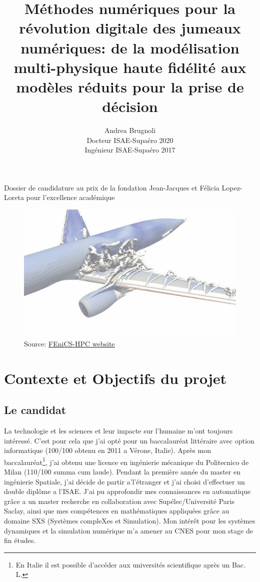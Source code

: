 \documentclass[french]{article}
\author{Andrea Brugnoli \\ 
\hspace{2.8pt} Docteur ISAE-Supaéro 2020\\
Ingénieur ISAE-Supaéro 2017}
\title{Méthodes numériques pour la révolution digitale des jumeaux numériques: de la modélisation multi-physique haute fidélité aux modèles réduits pour la prise de décision}
\date{}
\begin{document}
\maketitle

\large{Dossier de candidature au prix de la fondation Jean-Jacques et Félicia
	Lopez-Loreta pour l’excellence académique}


\begin{figure}[h]
	\centering
	\includegraphics[width=.95\textwidth]{3Dplane.jpg}
	\captionsetup{labelformat=empty}
	\caption{Source: \href{http://www.fenics-hpc.org/}{FEniCS-HPC website}}
\end{figure}





\thispagestyle{empty}

\newpage

\section{Contexte et Objectifs du projet}

\subsection{Le candidat}
La technologie et les sciences et leur impacte sur l'humaine m'ont toujours intéressé. C'est pour cela que j'ai opté pour un baccalauréat littéraire avec option informatique (100/100 obtenu en 2011 a Vérone, Italie). Après mon baccalauréat\footnote{En Italie il est possible d'accéder aux universités scientifique après un Bac. L.}, j'ai obtenu une licence en ingénierie mécanique du Politecnico de Milan (110/100 summa cum laude). Pendant la première année du master en ingénierie Spatiale, j'ai décide de partir a'l'étranger et j'ai choisi d'effectuer un double diplôme a l'ISAE. J'ai pu approfondir mes connaissances en automatique grâce a un master recherche en collaboration avec Supélec/Université Paris Saclay, ainsi que mes compétences en mathématiques appliquées grâce au domaine SXS (Systèmes compleXes et Simulation). Mon intérêt pour les systèmes dynamiques et la simulation numérique m'a amener au CNES pour mon stage de fin études. 
\end{document}
